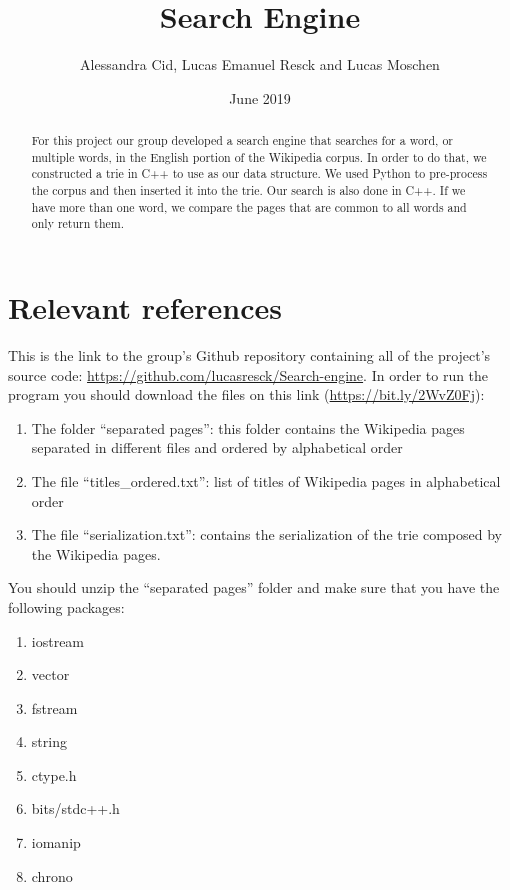 \documentclass{article}
\title{Search Engine}
\author{Alessandra Cid, Lucas Emanuel Resck  
and Lucas Moschen}
\date{June 2019}
\begin{document}
\maketitle

\begin{abstract}
For this project our group developed a search engine that searches for a word, or multiple words, in the English portion of the Wikipedia corpus. In order to do that, we constructed a trie in C++ to use as our data structure. We used Python to pre-process the corpus and then inserted it into the trie. Our search is also done in C++. If we have more than one word, we compare the pages that are common to all words and only return them. 
\end{abstract}

\section*{Relevant references}
This is the link to the group's Github repository containing all of the project's source code: \url{https://github.com/lucasresck/Search-engine}.
In order to run the program you should download the files on this link (\url{https://bit.ly/2WvZ0Fj}): 

\begin{enumerate}
\item The folder ``separated pages'': this folder contains the Wikipedia pages separated in different files and ordered by alphabetical order

\item The file ``titles\_ordered.txt'': list of titles of Wikipedia pages in alphabetical order

\item The file ``serialization.txt'': contains the serialization of the trie composed by the Wikipedia pages. 

 \end{enumerate}

You should unzip the ``separated pages'' folder and make sure that you have the following packages:
\begin{enumerate}
\item iostream
\item vector
\item fstream
\item string
\item ctype.h
\item bits/stdc++.h
\item iomanip
\item chrono
 \end{enumerate}
\end{document}
